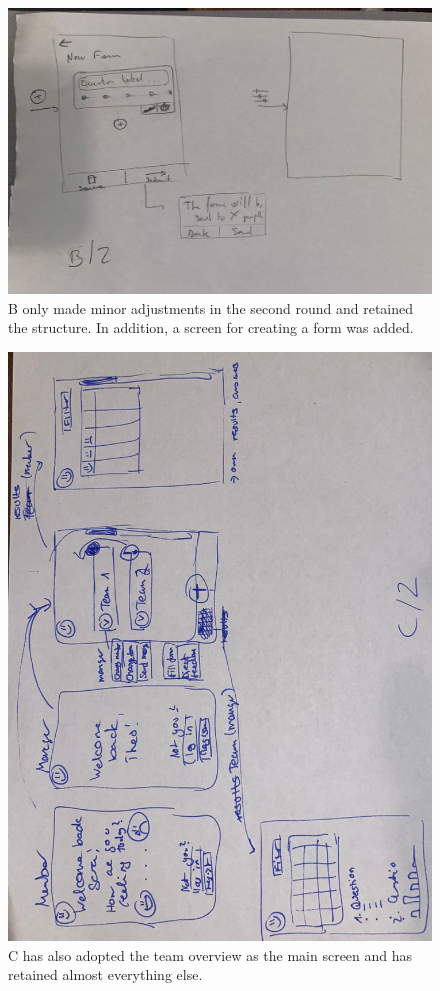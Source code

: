 \documentclass[11pt]{article}
\begin{document}
\begin{figure}[!h]
    \centering
    \includegraphics[width = \textwidth]{figures/B2.jpg}
    \caption{B only made minor adjustments in the second round and retained the structure. In addition, a screen for creating a form was added.}
\end{figure}

\begin{figure}[!h]
    \centering
    \includegraphics[width = \textwidth]{figures/C2.jpg}
    \caption{C has also adopted the team overview as the main screen and has retained almost everything else.}
\end{figure}
\end{document}
